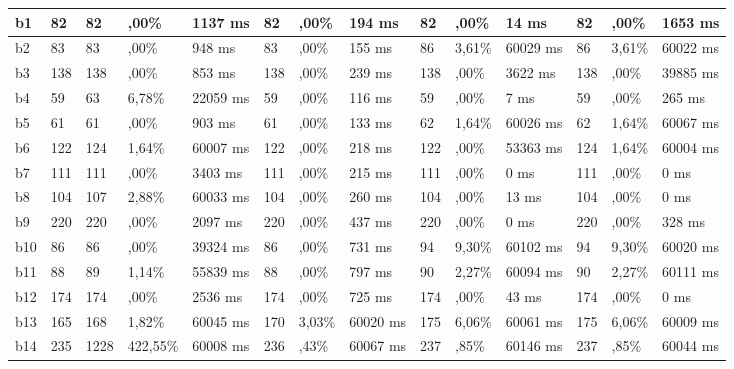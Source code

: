 \begin{table}[]
\begin{adjustbox}{angle=90}
{\begin{tabular}{|c|c|l|l|l|l|l|l|l|l|l|l|l|l|}
\multicolumn{1}{|l|}{b1} & \multicolumn{1}{l|}{82} &82 & ,00\% & 1137 ms  & 82 & ,00\% & 194 ms  & 82 & ,00\% & 14 ms  & 82 & ,00\% & 1653 ms \\ \hline
\multicolumn{1}{|l|}{b2} & \multicolumn{1}{l|}{83} &83 & ,00\% & 948 ms  & 83 & ,00\% & 155 ms  & 86 & 3,61\% & 60029 ms  & 86 & 3,61\% & 60022 ms \\ \hline
\multicolumn{1}{|l|}{b3} & \multicolumn{1}{l|}{138} &138 & ,00\% & 853 ms  & 138 & ,00\% & 239 ms  & 138 & ,00\% & 3622 ms  & 138 & ,00\% & 39885 ms \\ \hline
\multicolumn{1}{|l|}{b4} & \multicolumn{1}{l|}{59} &63 & 6,78\% & 22059 ms  & 59 & ,00\% & 116 ms  & 59 & ,00\% & 7 ms  & 59 & ,00\% & 265 ms \\ \hline
\multicolumn{1}{|l|}{b5} & \multicolumn{1}{l|}{61} &61 & ,00\% & 903 ms  & 61 & ,00\% & 133 ms  & 62 & 1,64\% & 60026 ms  & 62 & 1,64\% & 60067 ms \\ \hline
\multicolumn{1}{|l|}{b6} & \multicolumn{1}{l|}{122} &124 & 1,64\% & 60007 ms  & 122 & ,00\% & 218 ms  & 122 & ,00\% & 53363 ms  & 124 & 1,64\% & 60004 ms \\ \hline
\multicolumn{1}{|l|}{b7} & \multicolumn{1}{l|}{111} &111 & ,00\% & 3403 ms  & 111 & ,00\% & 215 ms  & 111 & ,00\% & 0 ms  & 111 & ,00\% & 0 ms \\ \hline
\multicolumn{1}{|l|}{b8} & \multicolumn{1}{l|}{104} &107 & 2,88\% & 60033 ms  & 104 & ,00\% & 260 ms  & 104 & ,00\% & 13 ms  & 104 & ,00\% & 0 ms \\ \hline
\multicolumn{1}{|l|}{b9} & \multicolumn{1}{l|}{220} &220 & ,00\% & 2097 ms  & 220 & ,00\% & 437 ms  & 220 & ,00\% & 0 ms  & 220 & ,00\% & 328 ms \\ \hline
\multicolumn{1}{|l|}{b10} & \multicolumn{1}{l|}{86} &86 & ,00\% & 39324 ms  & 86 & ,00\% & 731 ms  & 94 & 9,30\% & 60102 ms  & 94 & 9,30\% & 60020 ms \\ \hline
\multicolumn{1}{|l|}{b11} & \multicolumn{1}{l|}{88} &89 & 1,14\% & 55839 ms  & 88 & ,00\% & 797 ms  & 90 & 2,27\% & 60094 ms  & 90 & 2,27\% & 60111 ms \\ \hline
\multicolumn{1}{|l|}{b12} & \multicolumn{1}{l|}{174} &174 & ,00\% & 2536 ms  & 174 & ,00\% & 725 ms  & 174 & ,00\% & 43 ms  & 174 & ,00\% & 0 ms \\ \hline
\multicolumn{1}{|l|}{b13} & \multicolumn{1}{l|}{165} &168 & 1,82\% & 60045 ms  & 170 & 3,03\% & 60020 ms  & 175 & 6,06\% & 60061 ms  & 175 & 6,06\% & 60009 ms \\ \hline
\multicolumn{1}{|l|}{b14} & \multicolumn{1}{l|}{235} &1228 & 422,55\% & 60008 ms  & 236 & ,43\% & 60067 ms  & 237 & ,85\% & 60146 ms  & 237 & ,85\% & 60044 ms \\ \hline

\end{tabular}}
\end{adjustbox}
\end{table}
